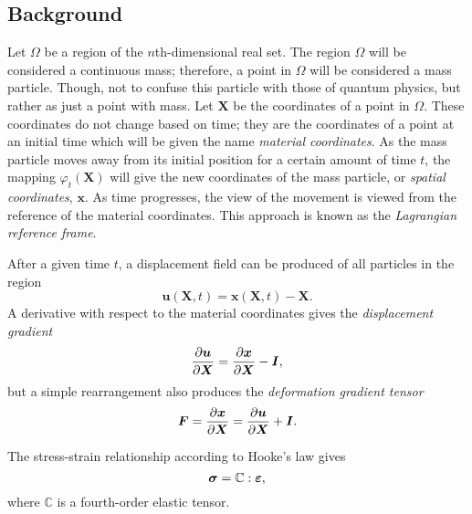 \subsection{Background}
Let $\Omega$ be a region of the $n$th-dimensional real set. The region $\Omega$ will be considered a continuous mass; therefore, a point in $\Omega$ will be considered a mass particle. Though, not to confuse this particle with those of quantum physics, but rather as just a point with mass. Let $\bm{X}$ be the coordinates of a point in $\Omega$. These coordinates do not change based on time; they are the coordinates of a point at an initial time which will be given the name \textit{material coordinates}. As the mass particle moves away from its initial position for a certain amount of time $t$, the mapping $\varphi_t(\bm{X})$ will give the new coordinates of the mass particle, or \textit{spatial coordinates}, $\bm{x}$. As time progresses, the view of the movement is viewed from the reference of the material coordinates. This approach is known as the \textit{Lagrangian reference frame}.

After a given time $t$, a displacement field can be produced of all particles in the region
\begin{equation*}
  \bm{u}(\bm{X},t) = \bm{x}(\bm{X},t) - \bm{X}.
\end{equation*}
A derivative with respect to the material coordinates gives the \textit{displacement gradient}
\begin{equation*}
  \frac{\partial\bm{u}}{\partial\bm{X}} = \frac{\partial\bm{x}}{\partial\bm{X}} - \bm{I},
\end{equation*}
but a simple rearrangement also produces the \textit{deformation gradient tensor}
\begin{equation*}
  \bm{F} = \frac{\partial\bm{x}}{\partial\bm{X}} = \frac{\partial\bm{u}}{\partial\bm{X}} + \bm{I}.
\end{equation*}

The stress-strain relationship according to Hooke's law gives
\begin{equation}
  \label{eq::Hookes_Law}
  \bm{\sigma} = \mathbb{C}:\bm{\varepsilon},
\end{equation}
where $\mathbb{C}$ is a fourth-order elastic tensor.
